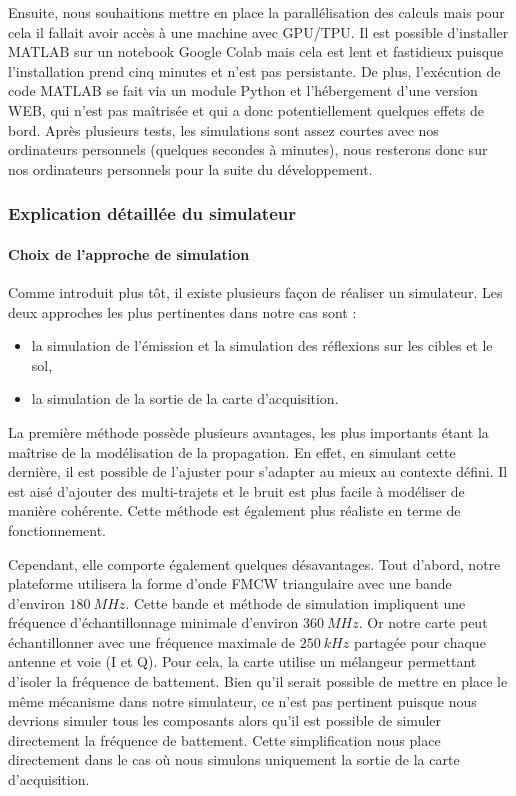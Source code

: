 Ensuite, nous souhaitions mettre en place la parallélisation des calculs mais pour cela il fallait avoir accès à une machine avec GPU/TPU. Il est possible d'installer MATLAB sur un notebook Google Colab mais cela est lent et fastidieux puisque l'installation prend cinq minutes et n'est pas persistante. De plus, l'exécution de code MATLAB se fait via un module Python et l'hébergement d'une version WEB, qui n'est pas maîtrisée et qui a donc potentiellement quelques effets de bord. Après plusieurs tests, les simulations sont assez courtes avec nos ordinateurs personnels (quelques secondes à minutes), nous resterons donc sur nos ordinateurs personnels pour la suite du développement. 

\subsubsection{Explication détaillée du simulateur}\label{subsubsec:explication_simu}

\paragraph{Choix de l'approche de simulation}
Comme introduit plus tôt, il existe plusieurs façon de réaliser un simulateur. Les deux approches les plus pertinentes dans notre cas sont :
\begin{itemize}
    \item la simulation de l'émission et la simulation des réflexions sur les cibles et le sol,
    \item la simulation de la sortie de la carte d'acquisition.
\end{itemize}

La première méthode possède plusieurs avantages, les plus importants étant la maîtrise de la modélisation de la propagation. En effet, en simulant cette dernière, il est possible de l'ajuster pour s'adapter au mieux au contexte défini. Il est aisé d'ajouter des multi-trajets et le bruit est plus facile à modéliser de manière cohérente. Cette méthode est également plus réaliste en terme de fonctionnement. 

Cependant, elle comporte également quelques désavantages. Tout d'abord, notre plateforme utilisera la forme d'onde FMCW triangulaire avec une bande d'environ $180~MHz$. Cette bande et méthode de simulation impliquent une fréquence d'échantillonnage minimale d'environ $360~MHz$. Or notre carte peut échantillonner avec une fréquence maximale de $250~kHz$ partagée pour chaque antenne et voie (I et Q). Pour cela, la carte utilise un mélangeur permettant d'isoler la fréquence de battement. Bien qu'il serait possible de mettre en place le même mécanisme dans notre simulateur, ce n'est pas pertinent puisque nous devrions simuler tous les composants alors qu'il est possible de simuler directement la fréquence de battement. Cette simplification nous place directement dans le cas où nous simulons uniquement la sortie de la carte d'acquisition. 

